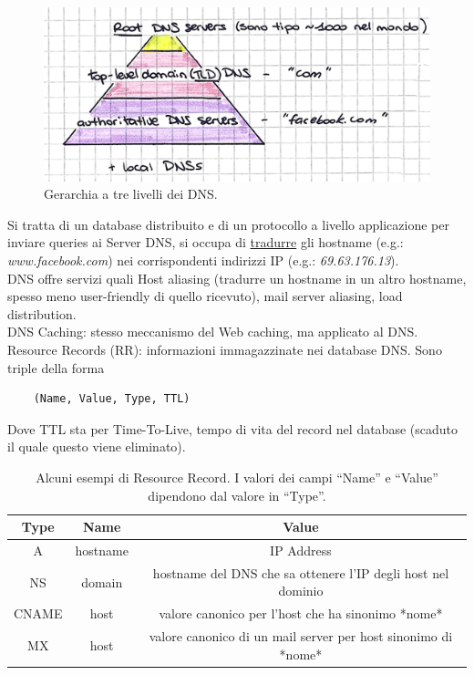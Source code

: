 \begin{figure}
 \begin{center}
 \includegraphics[width=1\linewidth]{Figures/02/dns-hiera.png}
  \end{center}
  \label{fig:gerarchia}
  \caption{Gerarchia a tre livelli dei DNS.}
\end{figure}

\noindent Si tratta di un database distribuito e di un protocollo a livello applicazione per inviare queries ai Server DNS, si occupa di \underline{tradurre} gli hostname (e.g.: \textit{www.facebook.com}) nei corrispondenti indirizzi IP (e.g.: \textit{69.63.176.13}).\\

\noindent DNS offre servizi quali Host aliasing (tradurre un hostname in un altro hostname, spesso meno user-friendly di quello ricevuto), mail server aliasing, load distribution.\\

\noindent DNS Caching: stesso meccanismo del Web caching, ma applicato al DNS.\\

\noindent Resource Records (RR): informazioni immagazzinate nei database DNS. Sono triple della forma
\begin{verbatim}
    (Name, Value, Type, TTL)
\end{verbatim}
\noindent Dove TTL sta per Time-To-Live, tempo di vita del record nel database (scaduto il quale questo viene eliminato).

\begin{table}[h]
\begin{tabular}{|c|c|c|}
\hline
\textbf{Type} & \textbf{Name} & \textbf{Value}                                                \\ \hline
A             & hostname      & IP Address                                                    \\ \hline
NS           & domain        & hostname del DNS che sa ottenere l'IP degli host nel dominio  \\ \hline
CNAME         & host          & valore canonico per l'host che ha sinonimo *nome*             \\ \hline
MX            & host          & valore canonico di un mail server per host sinonimo di *nome* \\ \hline
\end{tabular}
\label{tab:rr}
\caption{Alcuni esempi di Resource Record. I valori dei campi ``Name'' e ``Value'' dipendono dal valore in ``Type''.}
\end{table}

